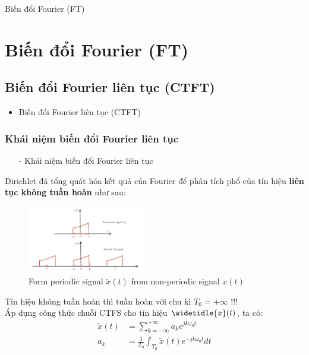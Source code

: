 \documentclass[8pt]{beamer}
\begin{document}
\begin{frame}{Biến đổi Fourier (FT)}
\section{Biến đổi Fourier (FT)}
\subsection{Biến đổi Fourier liên tục (CTFT)}
\begin{itemize}
	\item Biến đổi Fourier liên tục (CTFT)
\end{itemize}
\subsubsection{Khái niệm biến đổi Fourier liên tục}
\begin{itemize}
	\item[-] Khái niệm biến đổi Fourier liên tục
\end{itemize}
Dirichlet đã tổng quát hóa kết quả của Fourier để phân tích phổ của tín hiệu \textbf{liên tục không tuần hoàn} như sau:
\begin{figure}[h]
			\includegraphics[width=0.46\textwidth]{signal.jpg}
			\caption{Form periodic signal $\widetilde{x}(t)$ from non-periodic signal $x(t)$}\label{fig:re11}

		\end{figure}
		\alert{Tín hiệu không tuần hoàn thì tuần hoàn với chu kì $T_{0}=+\infty$ !!!}
\\Áp dụng công thức chuỗi CTFS cho tín hiệu $\widetidle{x}(t)$, ta có:
\begin{equation*}
	\begin{split}
		\widetilde{x}(t)&=\sum_{k=-\infty}^{+\infty}a_{k}e^{jk\omega_{0}t}\\
		a_{k}&=\frac{1}{T_{0}}\int_{T_{0}}\widetilde{x}(t)e^{-jk\omega_{0}t}dt
	\end{split}
\end{equation*}
\end{frame}
\end{document}

